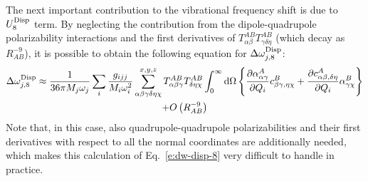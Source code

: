 \documentclass[a4paper,titlepage,twoside,fleqn,12pt]{book}
\newcommand{\fderiv}[2]{\ensuremath{
    \frac{\partial #1}{\partial #2}}}
\begin{document}
\begin{refsection}
The next important contribution to the vibrational frequency 
shift is due to $U_{8}^{\rm Disp}$ term. By neglecting the 
contribution from the dipole\hyp{}quadrupole polarizability 
interactions and the first derivatives of $T^{AB}_{\alpha\beta}T^{AB}_{\gamma\delta\eta}$ 
(which decay as $R^{-9}_{AB}$), it is possible to obtain 
the following equation for $\Delta \omega_{j,8}^{\rm Disp}$: 
%
\begin{multline} \label{e:dw-disp-8}
 \Delta\omega_{j,8}^{\rm Disp} \approx 
\frac{1}{36\pi M_j\omega_j}\sum_i \frac{g_{ijj}}{M_i\omega_i^2} 
\sum_{\alpha\beta\gamma\delta\eta\chi}^{x,y,z}   
T^{AB}_{\alpha\beta\gamma}T^{AB}_{\delta\eta\chi}
%
\int_{0}^{\infty} {\rm d}\Omega
 \left\{
\frac{\partial \alpha_{\alpha\gamma}^{A}}{\partial Q_i} c^{B}_{\beta\gamma,\eta\chi}
+
\fderiv{c^{A}_{\alpha\beta,\delta\eta}}{Q_i} \alpha^B_{\gamma\chi}
\right\}  \\
+ O\left( R^{-9}_{AB}\right)
\end{multline}
%
Note that, in this case, also quadrupole\hyp{}quadrupole 
polarizabilities and their first derivatives with respect 
to all the normal coordinates are additionally needed, 
which makes this calculation of Eq.~\eqref{e:dw-disp-8} 
very difficult to handle in practice. 


\end{refsection}
\end{document}
